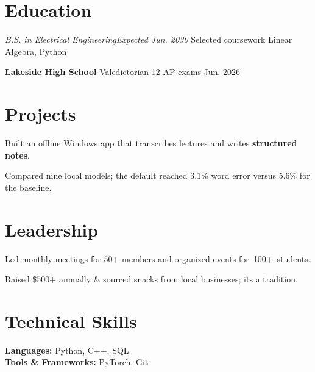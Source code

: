\documentclass[letterpaper,11pt]{article}
\newcommand{\resumeItem}[1]{\item #1}
\begin{document}
\fontsize{10.5}{12.4}\selectfont
{}
\vspace{-9pt}

\section{Education}
\resumeSubHeadingListStart
{}
{\textit{B.S. in Electrical Engineering}}{\textit{Expected Jun. 2030}}
\newline Selected coursework \textbar{} Linear Algebra, Python
\item \textbf{Lakeside High School} \textbar{} Valedictorian \textbar{} 12 AP exams \hfill Jun. 2026
\resumeSubHeadingListEnd

\section{Projects}
\resumeSubHeadingListStart
{}
\resumeItemListStart
\resumeItem{Built an offline Windows app that transcribes lectures and writes \textbf{structured notes}.}
\resumeItem{Compared nine local models; the default reached 3.1\% word error versus 5.6\% for the baseline.}
\resumeItemListEnd
\resumeSubHeadingListEnd

\section{Leadership}
\resumeSubHeadingListStart
{}
\resumeItemListStart
\resumeItem{Led monthly meetings for 50+ members and organized events for~100+~students.}
\resumeItem{Raised \$500+ annually \& sourced snacks from local businesses; it\textquotesingle s a tradition.}
\resumeItemListEnd
\resumeSubHeadingListEnd

\section{Technical Skills}
\textbf{Languages:} Python, C++, SQL\\
\textbf{Tools \& Frameworks:} PyTorch, Git
\end{document}
